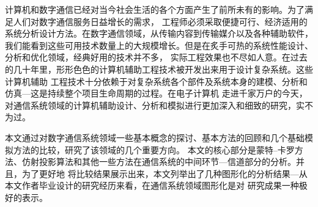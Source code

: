 \begin{cnabstract}
计算机和数字通信已经对当今社会生活的各个方面产生了前所未有的影响。为了满足人们对数字通信服务日益增长的需求，
工程师必须采取便捷可行、经济适用的系统分析设计方法。在数字通信领域，从传输内容到传输媒介以及各种辅助软件，
我们能看到这些可用技术数量上的大规模增长。但是在炙手可热的系统性能设计、分析和优化领域，经典好用的技术并不多，
实际工程效果也不尽如人意。在过去的几十年里，形形色色的计算机辅助工程技术被开发出来用于设计复杂系统。这些计算机辅助
工程技术十分依赖于对复杂系统各个部件及系统本身的建模、分析和仿真---这是持续整个项目生命周期的过程。在电子计算机
走进千家万户的今天，对通信系统领域的计算机辅助设计、分析和模拟进行更加深入和细致的研究，实不为过。
\par
本文通过对数字通信系统领域一些基本概念的探讨、基本方法的回顾和几个基础模拟方法的比较，研究了该领域的几个重要方向。
本文的核心部分是蒙特--卡罗方法、仿射投影算法和其他一些方法在通信系统的中间环节---信道部分的分析。并且，为了更好地
将比较结果展示出来，本文列举出了几种图形化的分析结果---从本文作者毕业设计的研究经历来看，在通信系统领域图形化是对
研究成果一种极好的表示。
\par

\end{cnabstract}

